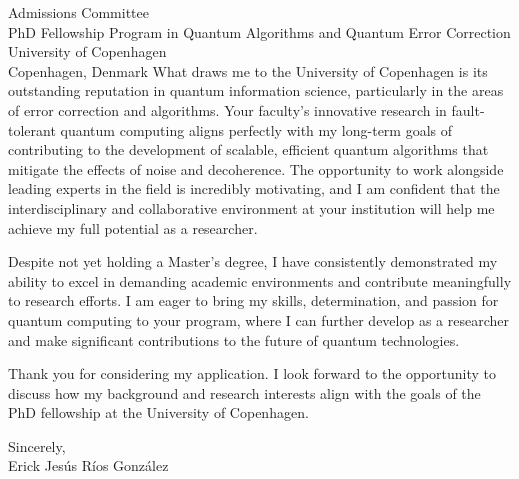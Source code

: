 \documentclass[a4paper,10pt]{letter}
\begin{document}
\begin{letter}{Admissions Committee\\
PhD Fellowship Program in Quantum Algorithms and Quantum Error Correction\\
University of Copenhagen\\
Copenhagen, Denmark}
What draws me to the University of Copenhagen is its outstanding reputation in quantum information science, particularly in the areas of error correction and algorithms. Your faculty’s innovative 
research in fault-tolerant quantum computing aligns perfectly with my long-term goals of contributing to the development of scalable, efficient quantum algorithms that mitigate the effects of noise 
and decoherence. The opportunity to work alongside leading experts in the field is incredibly motivating, and I am confident that the interdisciplinary and collaborative environment at your institution 
will help me achieve my full potential as a researcher.

Despite not yet holding a Master's degree, I have consistently demonstrated my ability to excel in demanding academic environments and contribute meaningfully to research efforts. I am eager to bring my 
skills, determination, and passion for quantum computing to your program, where I can further develop as a researcher and make significant contributions to the future of quantum technologies.

Thank you for considering my application. I look forward to the opportunity to discuss how my background and research interests align with the goals of the PhD fellowship at the University of Copenhagen.

\closing{Sincerely,\\[2em] %
Erick Jesús Ríos González}
\end{letter}
\end{document}
